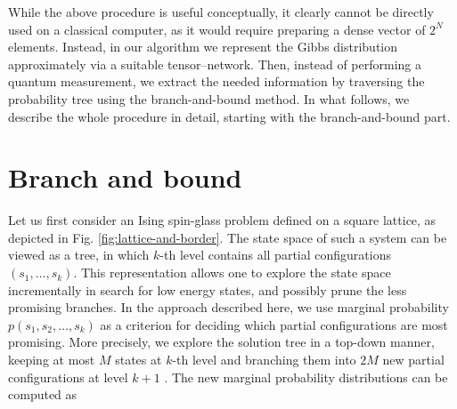 While the above procedure is useful conceptually, it clearly cannot be directly
used on a classical computer, as it would require preparing a dense vector of
$2^{N}$ elements. Instead, in our algorithm we represent the Gibbs distribution
approximately via a suitable tensor--network. Then, instead of performing a
quantum measurement, we extract the needed information by traversing the
probability tree using the branch-and-bound method. In what follows, we
describe the whole procedure in detail, starting with the branch-and-bound
part.

\section{Branch and bound}
Let us first consider an Ising spin-glass problem defined on a square lattice,
as depicted in Fig. \ref{fig:lattice-and-border}. The state space of such a
system can be viewed as a tree, in which $k$-th level contains all partial
configurations $(s_1, \ldots, s_k)$. This representation allows one to explore
the state space incrementally in search for low energy states, and possibly
prune the less promising branches. In the approach described here, we use
marginal probability $p(s_1, s_2, \ldots, s_k)$ as a criterion for deciding
which partial configurations are most promising. More precisely, we explore the
solution tree in a top-down manner, keeping at most $M$ states at $k$-th level
and branching them into $2M$ new partial configurations at level $k+1$ . The
new marginal probability distributions can be computed as

